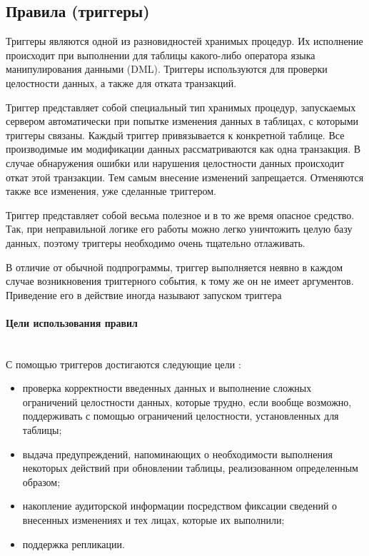 \subsection{Правила (триггеры)}
Триггеры являются одной из разновидностей хранимых процедур. Их исполнение происходит при выполнении для таблицы какого-либо оператора языка манипулирования данными (DML). Триггеры используются для проверки целостности данных, а также для отката транзакций.

Триггер представляет собой специальный тип хранимых процедур, запускаемых сервером автоматически при попытке изменения данных в таблицах, с которыми триггеры связаны. Каждый триггер привязывается к конкретной таблице. Все производимые им модификации данных рассматриваются как одна транзакция. В случае обнаружения ошибки или нарушения целостности данных происходит откат этой транзакции. Тем самым внесение изменений запрещается. Отменяются также все изменения, уже сделанные триггером.

Триггер представляет собой весьма полезное и в то же время опасное средство. Так, при неправильной логике его работы можно легко уничтожить целую базу данных, поэтому триггеры необходимо очень тщательно отлаживать.

В отличие от обычной подпрограммы, триггер выполняется неявно в каждом случае возникновения триггерного события, к тому же он не имеет аргументов. Приведение его в действие иногда называют запуском триггера \autocite{IntuitTrigg}

\paragraph{Цели использования правил} ~\\

С помощью триггеров достигаются следующие цели \autocite{IntuitTrigg}:
\begin{itemize}
\item проверка корректности введенных данных и выполнение сложных ограничений целостности данных, которые трудно, если вообще возможно, поддерживать с помощью ограничений целостности, установленных для таблицы;
\item выдача предупреждений, напоминающих о необходимости выполнения некоторых действий при обновлении таблицы, реализованном определенным образом;
\item накопление аудиторской информации посредством фиксации сведений о внесенных изменениях и тех лицах, которые их выполнили;
\item поддержка репликации.
\end{itemize}
